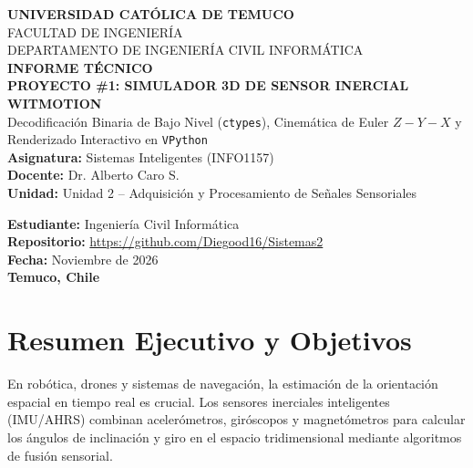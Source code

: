 \documentclass[12pt,letterpaper]{article}
\begin{document}
\begin{titlepage}
    \centering
    \vspace*{1.5cm}
    {\Large\textbf{UNIVERSIDAD CATÓLICA DE TEMUCO}}\\[0.3cm]
    {\large FACULTAD DE INGENIERÍA}\\[0.2cm]
    {\large DEPARTAMENTO DE INGENIERÍA CIVIL INFORMÁTICA}\\[2.5cm]
    
    {\LARGE\bfseries INFORME TÉCNICO}\\[0.4cm]
    {\Large\bfseries PROYECTO \#1: SIMULADOR 3D DE SENSOR INERCIAL WITMOTION}\\[0.5cm]
    {\large Decodificación Binaria de Bajo Nivel (\texttt{ctypes}), Cinemática de Euler $Z-Y-X$ y Renderizado Interactivo en \texttt{VPython}}\\[2.5cm]
    
    \textbf{Asignatura:} Sistemas Inteligentes (INFO1157)\\[0.2cm]
    \textbf{Docente:} Dr. Alberto Caro S.\\[0.2cm]
    \textbf{Unidad:} Unidad 2 -- Adquisición y Procesamiento de Señales Sensoriales\\[2.0cm]
    
    \begin{flushright}
        \textbf{Estudiante:} Ingeniería Civil Informática\\
        \textbf{Repositorio:} \url{https://github.com/Diegood16/Sistemas2}\\
        \textbf{Fecha:} Noviembre de 2026\\
        \textbf{Temuco, Chile}
    \end{flushright}
    \vfill
\end{titlepage}

\newpage
\tableofcontents
\newpage

\section{Resumen Ejecutivo y Objetivos}

En robótica, drones y sistemas de navegación, la estimación de la orientación espacial en tiempo real es crucial. Los sensores inerciales inteligentes (IMU/AHRS) combinan acelerómetros, giróscopos y magnetómetros para calcular los ángulos de inclinación y giro en el espacio tridimensional mediante algoritmos de fusión sensorial.
\end{document}
